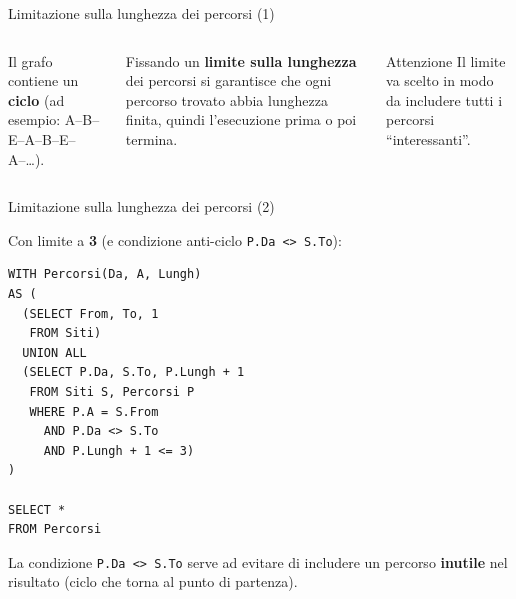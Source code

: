 \documentclass[aspectratio=169]{beamer}
\begin{document}
\begin{frame}{Limitazione sulla lunghezza dei percorsi (1)}

\begin{columns}[T]
Il grafo contiene un \textbf{ciclo} (ad esempio: A--B--E--A--B--E--A--\ldots).

\vspace{8pt}
Fissando un \textbf{limite sulla lunghezza} dei percorsi si garantisce che ogni percorso trovato abbia lunghezza finita, quindi l'esecuzione prima o poi termina.

\vspace{8pt}
\begin{block}{Attenzione}
Il limite va scelto in modo da includere tutti i percorsi ``interessanti''.
\end{block}

\vspace{10pt}
\end{columns}

\end{frame}

\begin{frame}[fragile]{Limitazione sulla lunghezza dei percorsi (2)}

Con limite a \textbf{3} (e condizione anti-ciclo \texttt{P.Da <> S.To}):

\begin{lstlisting}
WITH Percorsi(Da, A, Lungh)
AS (
  (SELECT From, To, 1
   FROM Siti)
  UNION ALL
  (SELECT P.Da, S.To, P.Lungh + 1
   FROM Siti S, Percorsi P
   WHERE P.A = S.From
     AND P.Da <> S.To
     AND P.Lungh + 1 <= 3)
)

SELECT *
FROM Percorsi
\end{lstlisting}

\vspace{4pt}
La condizione \texttt{P.Da <> S.To} serve ad evitare di includere un percorso \textbf{inutile} nel risultato (ciclo che torna al punto di partenza).

\end{frame}
\end{document}
